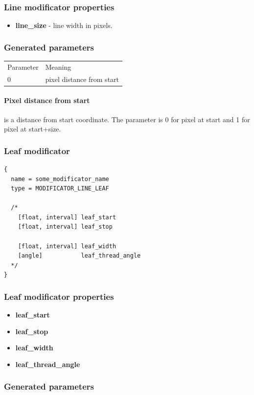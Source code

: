 \documentclass[9pt]{article}
\begin{document}
\subsubsection*{Line modificator properties}
\begin{itemize}
\item{\bf line\_size} - line width in pixels.
\end{itemize}

\subsubsection*{Generated parameters}

\begin{tabular}{|l||l|}
  Parameter & Meaning \\
  0 & pixel distance from start \\
\end{tabular}

\paragraph*{Pixel distance from start} is a distance from start coordinate. 
The parameter is 0 for pixel at start and 1 for pixel at start+size.

\subsubsection{Leaf modificator}

\begin{verbatim}
{
  name = some_modificator_name
  type = MODIFICATOR_LINE_LEAF

  /*
    [float, interval] leaf_start
    [float, interval] leaf_stop
  
    [float, interval] leaf_width
    [angle]           leaf_thread_angle
  */
}
\end{verbatim}
\subsubsection*{Leaf modificator properties}
\begin{itemize}
\item{\bf leaf\_start}
\item{\bf leaf\_stop}
\item{\bf leaf\_width}
\item{\bf leaf\_thread\_angle}
\end{itemize}

\subsubsection*{Generated parameters}
\end{document}
